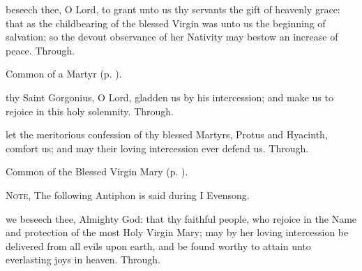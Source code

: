 \collect
{} beseech thee, O Lord, to grant unto us thy servants the gift of heavenly grace: that as the childbearing of the blessed Virgin was unto us the beginning of salvation; so the devout observance of her Nativity may bestow an increase of peace. Through.



\begin{rubric}
	Common of a Martyr (p. \pageref{CommonMartyrNotBishopCollect}).
\end{rubric}



\memorialCollect
{} thy Saint Gorgonius, O Lord, gladden us by his intercession; and make us to rejoice in this holy solemnity. Through.




\memorialCollect
{} let the meritorious confession of thy blessed Martyrs, Protus and Hyacinth, comfort us; and may their loving intercession ever defend us. Through.



\begin{rubric}
	Common of the Blessed Virgin Mary (p. \pageref{CommonBVM}).
\end{rubric}

\begin{rubric}
	\textsc{Note,} The following Antiphon is said during I Evensong.
\end{rubric}


\collect
{} we beseech thee, Almighty God: that thy faithful people, who rejoice in the Name and protection of the most Holy Virgin Mary; may by her loving intercession be delivered from all evils upon earth, and be found worthy to attain unto everlasting joys in heaven. Through.


